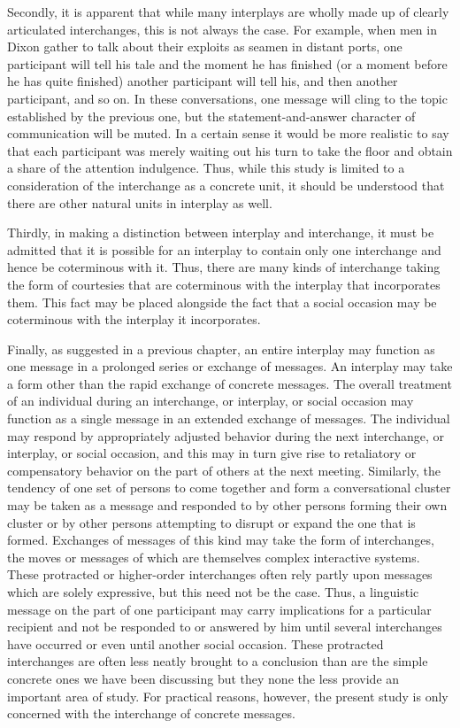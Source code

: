 \documentclass[twoside,symmetric,nobib,justified]{tufte-book}
\begin{document}
Secondly, it is apparent that while many interplays are wholly made up
of clearly articulated interchanges, this is not always the case. For
example, when men in Dixon gather to talk about their exploits as seamen
in distant ports, one participant will tell his tale and the moment he
has finished (or a moment before he has quite finished) another
participant will tell his, and then another participant, and so on. In
these conversations, one message will cling to the topic established by
the previous one, but the statement-and-answer character of
communication will be muted. In a certain sense it would be more
realistic to say that each participant was merely waiting out his turn
to take the floor and obtain a share of the attention indulgence. Thus,
while this study is limited to a consideration of the interchange as a
concrete unit, it should be understood that there are other natural
units in interplay as well.

Thirdly, in making a distinction between interplay and interchange, it
must be admitted that it is possible for an interplay to contain only
one interchange and hence be coterminous with it. Thus, there are many
kinds of interchange taking the form of courtesies that are coterminous
with the interplay that incorporates them. This fact may be placed
alongside the fact that a social occasion may be coterminous with the
interplay it incorporates.

Finally, as suggested in a previous chapter, an entire interplay may
function as one message in a prolonged series or exchange of messages.
An interplay may take a form other than the rapid exchange of concrete
messages. The overall treatment of an individual during an interchange,
or interplay, or social occasion may function as a single message in an
extended exchange of messages. The individual may respond by
appropriately adjusted behavior during the next interchange, or
interplay, or social occasion, and this may in turn give rise to
retaliatory or compensatory behavior on the part of others at the next
meeting. Similarly, the tendency of one set of persons to come together
and form a conversational cluster may be taken as a message and
responded to by other persons forming their own cluster or by other
persons attempting to disrupt or expand the one that is formed.
Exchanges of messages of this kind may take the form of interchanges,
the moves or messages of which are themselves complex interactive
systems. These protracted or higher-order interchanges often rely partly
upon messages which are solely expressive, but this need not be the
case. Thus, a linguistic message on the part of one participant may
carry implications for a particular recipient and not be responded to or
answered by him until several interchanges have occurred or even until
another social occasion. These protracted interchanges are often less
neatly brought to a conclusion than are the simple concrete ones we have
been discussing but they none the less provide an important area of
study. For practical reasons, however, the present study is only
concerned with the interchange of concrete messages.
\end{document}

